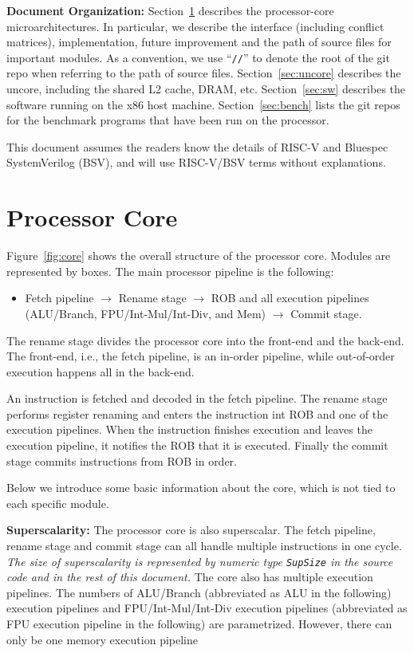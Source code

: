 \documentclass[12pt]{article}
\newcommand{\code}[1]{\texttt{#1}}
\begin{document}
\noindent\textbf{Document Organization:}
Section~\ref{sec:core} describes the processor-core microarchitectures.
In particular, we describe the interface (including conflict matrices), implementation, future improvement and the path of source files for important modules.
As a convention, we use ``\code{//}'' to denote the root of the git repo when referring to the path of source files.
Section~\ref{sec:uncore} describes the uncore, including the shared L2 cache, DRAM, etc.
Section~\ref{sec:sw} describes the software running on the x86 host machine.
Section~\ref{sec:bench} lists the git repos for the benchmark programs that have been run on the processor.

This document assumes the readers know the details of RISC-V and Bluespec SystemVerilog (BSV), and will use RISC-V/BSV terms without explanations.

\section{Processor Core}\label{sec:core}

Figure~\ref{fig:core} shows the overall structure of the processor core.
Modules are represented by boxes.
The main processor pipeline is the following:
\begin{itemize}
    \item Fetch pipeline $\rightarrow$ Rename stage $\rightarrow$ ROB and all execution pipelines (ALU/Branch, FPU/Int-Mul/Int-Div, and Mem) $\rightarrow$ Commit stage.
\end{itemize}
The rename stage divides the processor core into the front-end and the back-end.
The front-end, i.e., the fetch pipeline, is an in-order pipeline, while out-of-order execution happens all in the back-end.

An instruction is fetched and decoded in the fetch pipeline.
The rename stage performs register renaming and enters the instruction int ROB and one of the execution pipelines.
When the instruction finishes execution and leaves the execution pipeline, it notifies the ROB that it is executed.
Finally the commit stage commits instructions from ROB in order.

Below we introduce some basic information about the core, which is not tied to each specific module.

\noindent\textbf{Superscalarity:}
The processor core is also superscalar.
The fetch pipeline, rename stage and commit stage can all handle multiple instructions in one cycle.
\emph{The size of superscalarity is represented by numeric type \code{SupSize} in the source code and in the rest of this document.}
The core also has multiple execution pipelines.
The numbers of ALU/Branch (abbreviated as ALU in the following) execution pipelines and FPU/Int-Mul/Int-Div execution pipelines (abbreviated as FPU execution pipeline in the following) are parametrized.
However, there can only be one memory execution pipeline
\end{document}

